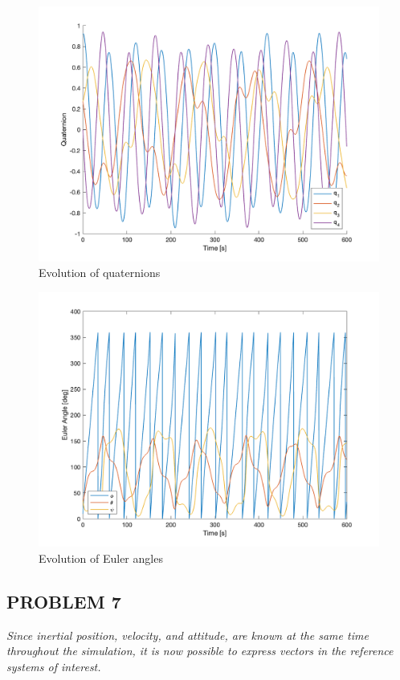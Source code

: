 \begin{figure}[H]
\centering
\includegraphics[scale=0.6]{Images/ps3_problem6_quaternions.png}
\caption{Evolution of quaternions}
\label{fig:ps3_problem6_quaternions}
\end{figure}

\begin{figure}[H]
\centering
\includegraphics[scale=0.6]{Images/ps3_problem6_euler.png}
\caption{Evolution of Euler angles}
\label{fig:ps3_problem6_euler}
\end{figure}

\subsection{PROBLEM 7}
\textit{Since inertial position, velocity, and attitude, are known at the same time throughout the simulation, it is now possible to express vectors in the reference systems of interest.}

